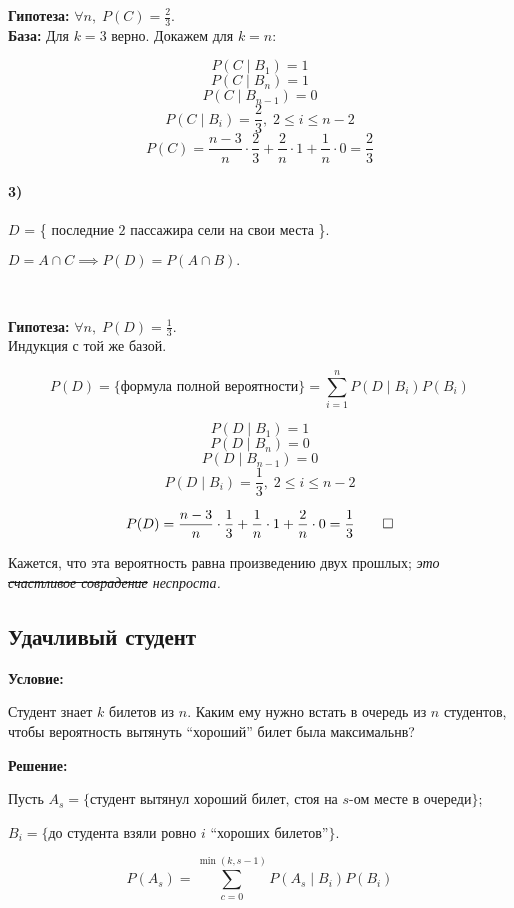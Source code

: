 \textbf{Гипотеза:} $\forall n,\; P(C) = \frac{2}{3}$. \\ 

\textbf{База:} Для $k=3$ верно. Докажем для $k=n:$

    \[P(C\mid B_1) = 1\]
    \[P(C\mid B_n) = 1\]
    \[P(C\mid B_{n-1}) = 0\]
    \[P(C\mid B_i) = \frac{2}{3}, \; 2\leqslant i\leqslant n-2\]
	\[P(C) = \frac{n-3}{n} \cdot \frac{2}{3} + \frac{2}{n} \cdot 1 + \frac{1}{n} \cdot 0 = \frac{2}{3}\]

\paragraph{3)}
    $D$ = \{ последние $2$ пассажира сели на свои места \}.
	
    $D = A\cap C \implies P(D) = P(A\cap B).$ 
    
~\
    
 \textbf{Гипотеза:} $\forall n,\; P(D) = \frac{1}{3}$. \\
 
 Индукция с той же базой.
 
    \[P(D) = \{\text{формула полной вероятности}\} = \sum\limits_{i=1}^n P(D\mid B_i)P(B_i)\]


    \[P(D\mid B_1) = 1\]
    \[P(D\mid B_n) = 0\]
    \[P(D\mid B_{n-1}) = 0\]
    \[P(D\mid B_i) = \frac{1}{3}, \; 2\leqslant i\leqslant n-2\]

    \[P(D) = \frac{n-3}{n}\cdot \frac{1}{3} + \frac{1}{n}\cdot 1 + \frac{2}{n}\cdot 0 = \frac{1}{3} \qed\]

    Кажется, что эта вероятность равна произведению двух прошлых; \emph{это \sout{счастливое соврадение} неспроста.}

\subsection{Удачливый студент}

\textbf{Условие:}

Студент знает $k$ билетов из $n$. Каким ему нужно встать в очередь из $n$ студентов, чтобы вероятность вытянуть ``хороший'' билет была максимальнв?

\textbf{Решение:} 

Пусть $A_s = \{\text{студент вытянул хороший билет, стоя на $s$-ом месте в очереди}\}$;

$B_i = \{\text{до студента взяли ровно $i$ ``хороших билетов''}\}$.

\[P(A_s) = \sum\limits_{c = 0}^{\min(k,s-1)} P(A_s\mid B_i)P(B_i)\]

